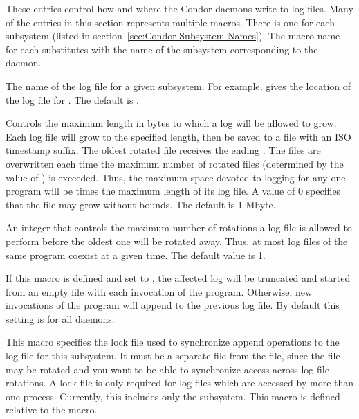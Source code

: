 These entries control how and where the Condor daemons write to log
files.  Many of the entries in this section represents multiple
macros. There is one for each subsystem (listed
in section~\ref{sec:Condor-Subsystem-Names}).
The macro name for each substitutes  with the name
of the subsystem corresponding to the daemon.
\begin{description}
  
\label{param:SubsysLog}
\item[\MacroB{<SUBSYS>\_LOG}]
  The name of
  the log file for a given subsystem.  For example,
   gives the location of the log file for
  . The default is .

\label{param:MaxSubsysLog}
\item[\Macro{MAX\_<SUBSYS>\_LOG}]
  Controls the maximum length in bytes to which a
  log will be allowed to grow.  Each log file will grow to the
  specified length, then be saved to a file with an ISO timestamp 
  suffix. The oldest rotated file receives the ending . 
  The  files are overwritten each time the maximum 
  number of rotated files (determined by the value of
  ) is exceeded.
  Thus, the maximum space devoted to logging for 
  any one program will be  times 
  the maximum length of its log file.  A value of 0 specifies that 
  the file may grow without bounds. The default is 1 Mbyte.
 
\label{param:MaxNumSubsysLog}
\item[\Macro{MAX\_NUM\_<SUBSYS>\_LOG}]
  An integer that controls the maximum number of rotations a log file 
  is allowed to perform before the oldest one will be 
  rotated away. Thus, at most 
  log files of the same program coexist at a given time.
  The default value is 1.

\label{param:TruncSubsysLogOnOpen}
\item[\Macro{TRUNC\_<SUBSYS>\_LOG\_ON\_OPEN}]
  If this macro is defined and set
  to , the affected log will be truncated and started from an
  empty file with each invocation of the program.  Otherwise, new
  invocations of the program will append to the previous log
  file.  By default this setting is  for all daemons. 

\label{param:SubsysLock} 
\item[\MacroB{<SUBSYS>\_LOCK}]
This macro
  specifies the lock file used to synchronize append operations to the
  log file for this subsystem.  It must be a separate file from the
   file, since the  file may be
  rotated and you want to be able to synchronize access across log
  file rotations.  A lock file is only required for log files which
  are accessed by more than one process.  Currently, this includes
  only the  subsystem.  This macro is defined relative
  to the  macro.


\end{description}
